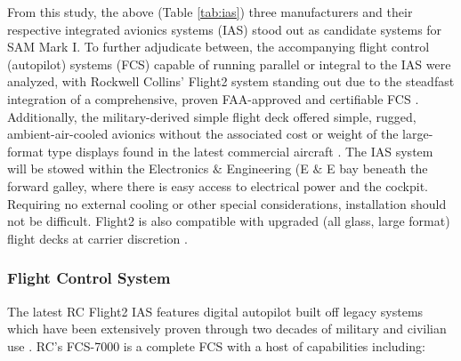 From this study, the above (Table \ref{tab:ias}) three manufacturers and their respective integrated avionics systems (IAS) stood out as candidate systems for SAM Mark I.  To further adjudicate between, the accompanying flight control (autopilot) systems (FCS) capable of running parallel or integral to the IAS were analyzed, with Rockwell Collins' Flight2 system standing out due to the steadfast integration of a comprehensive, proven FAA-approved and certifiable FCS \cite{fcs7000pdf}.  Additionally, the military-derived simple flight deck \cite{flight2page} offered simple, rugged, ambient-air-cooled avionics \cite{flight2pdf} without the associated cost or weight of the large-format type displays found in the latest commercial aircraft \cite{flight2page}.  The IAS system will be stowed within the Electronics $\&$ Engineering (E $\&$ E bay beneath the forward galley, where there is easy access to electrical power and the cockpit.  Requiring no external cooling or other special considerations, installation should not be difficult.  Flight2 is also compatible with upgraded (all glass, large format) flight decks at carrier discretion \cite{flight2page}. 


\subsubsection{Flight Control System}
The latest RC Flight2 IAS features digital autopilot built off legacy systems which have been extensively proven through two decades of military and civilian use \cite{flight2page}.  RC's FCS-7000 is a complete FCS with a host of capabilities \cite{fcs7000pdf} including:

